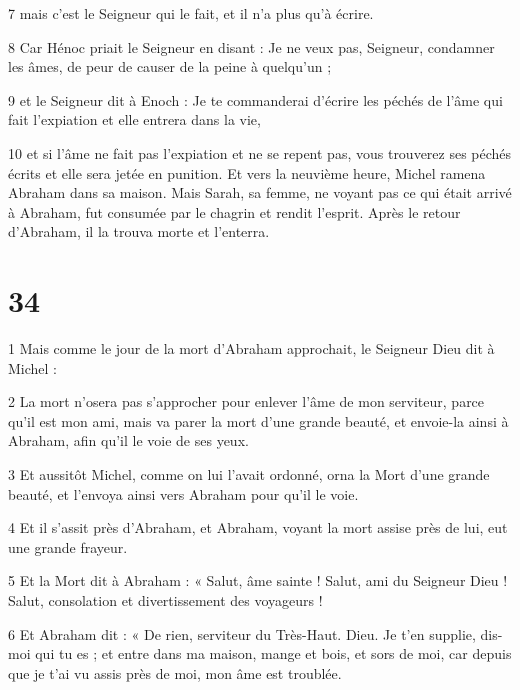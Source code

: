\par 7 mais c'est le Seigneur qui le fait, et il n'a plus qu'à écrire.

\par 8 Car Hénoc priait le Seigneur en disant : Je ne veux pas, Seigneur, condamner les âmes, de peur de causer de la peine à quelqu'un ;

\par 9 et le Seigneur dit à Enoch : Je te commanderai d'écrire les péchés de l'âme qui fait l'expiation et elle entrera dans la vie,

\par 10 et si l'âme ne fait pas l'expiation et ne se repent pas, vous trouverez ses péchés écrits et elle sera jetée en punition. Et vers la neuvième heure, Michel ramena Abraham dans sa maison. Mais Sarah, sa femme, ne voyant pas ce qui était arrivé à Abraham, fut consumée par le chagrin et rendit l'esprit. Après le retour d'Abraham, il la trouva morte et l'enterra.

\chapter{34}

\par 1 Mais comme le jour de la mort d'Abraham approchait, le Seigneur Dieu dit à Michel :

\par 2 La mort n'osera pas s'approcher pour enlever l'âme de mon serviteur, parce qu'il est mon ami, mais va parer la mort d'une grande beauté, et envoie-la ainsi à Abraham, afin qu'il le voie de ses yeux.

\par 3 Et aussitôt Michel, comme on lui l'avait ordonné, orna la Mort d'une grande beauté, et l'envoya ainsi vers Abraham pour qu'il le voie.

\par 4 Et il s'assit près d'Abraham, et Abraham, voyant la mort assise près de lui, eut une grande frayeur.

\par 5 Et la Mort dit à Abraham : « Salut, âme sainte ! Salut, ami du Seigneur Dieu ! Salut, consolation et divertissement des voyageurs !

\par 6 Et Abraham dit : « De rien, serviteur du Très-Haut. Dieu. Je t'en supplie, dis-moi qui tu es ; et entre dans ma maison, mange et bois, et sors de moi, car depuis que je t'ai vu assis près de moi, mon âme est troublée.


